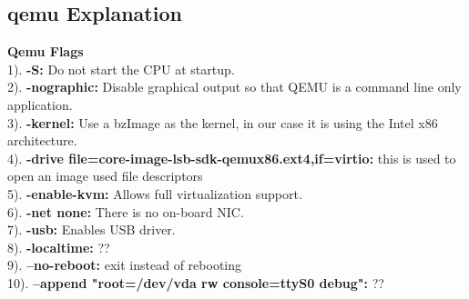 \documentclass[letterpaper,10pt]{article}
\begin{document}
\subsection{qemu Explanation}
{\bfseries Qemu Flags}\\
1). {\textbf{-S:}} Do not start the CPU at startup.\\
2). {\textbf{-nographic:}} Disable graphical output so that QEMU is a command line only application.\\
3). {\textbf{-kernel:}} Use a bzImage as the kernel, in our case it is using the Intel x86 architecture.\\
4). {\textbf{-drive file=core-image-lsb-sdk-qemux86.ext4,if=virtio:}} this is used to open an image used file descriptors\\
5). {\textbf{-enable-kvm:}} Allows full virtualization support.\\
6). {\textbf{-net none:}} There is no on-board NIC.\\
7). {\textbf{-usb:}} Enables USB driver.\\
8). {\textbf{-localtime:}} ??\\
9). {\textbf{--no-reboot:}} exit instead of rebooting\\
10). {\textbf{--append "root=/dev/vda rw console=ttyS0 debug":}} ??\\\\

\fi
\end{document}
